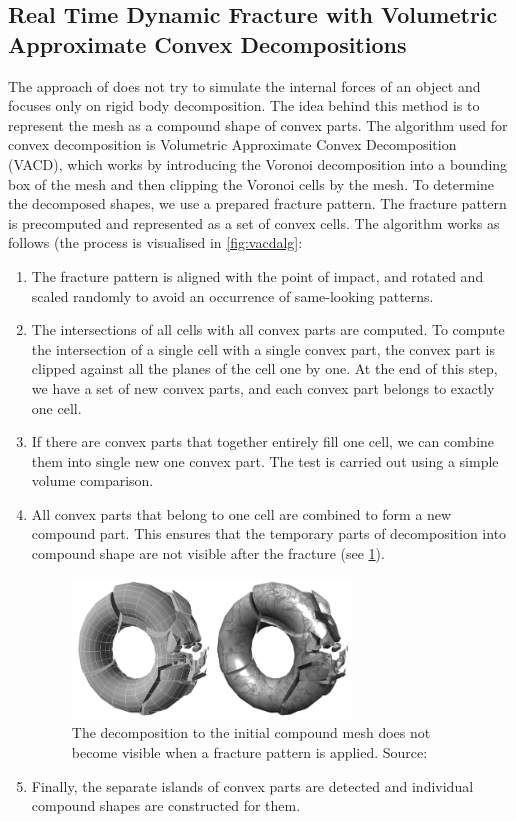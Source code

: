 \subsection{Real Time Dynamic Fracture
with Volumetric Approximate Convex Decompositions}
\label{sec:RTDF}
The approach of \citet{nvidia} does not try to simulate the internal forces of an object and focuses only on rigid body decomposition. The idea behind this method is to represent the mesh as a compound shape of convex parts. The algorithm used for convex decomposition is Volumetric Approximate Convex Decomposition (VACD), which works by introducing the Voronoi decomposition into a bounding box of the mesh and then clipping the Voronoi cells by the mesh. To determine the decomposed shapes, we use a prepared fracture pattern. The fracture pattern is precomputed and represented as a set of convex cells. The algorithm works as follows (the process is visualised in \cref{fig:vacdalg}:
\begin{enumerate}
\item The fracture pattern is aligned with the point of impact, and rotated and scaled randomly to avoid an occurrence of same-looking patterns.
\item The intersections of all cells with all convex parts are computed. To compute the intersection of a single cell with a single convex part, the convex part is clipped against all the planes of the cell one by one. 
At the end of this step, we have a set of new convex parts, and each convex part belongs to exactly one cell.
\item If there are convex parts that together entirely fill one cell, we can combine them into single new one convex part. The test is carried out using a simple volume comparison.
\item All convex parts that belong to one cell are combined to form a new compound part. This ensures that the temporary parts of decomposition into compound shape are not visible after the fracture (see \cref{fig:vacdfracture}).
\begin{figure}
        \centering
        \includegraphics[width=0.7\textwidth]{img/vacdfracture}
        \caption{The decomposition to the
initial compound mesh does not become visible when a fracture
pattern is applied. Source: \citet{nvidia}}
        \label{fig:vacdfracture}
\end{figure}
\item Finally, the separate islands of convex parts are detected and individual compound shapes are constructed for them.
\end{enumerate}

